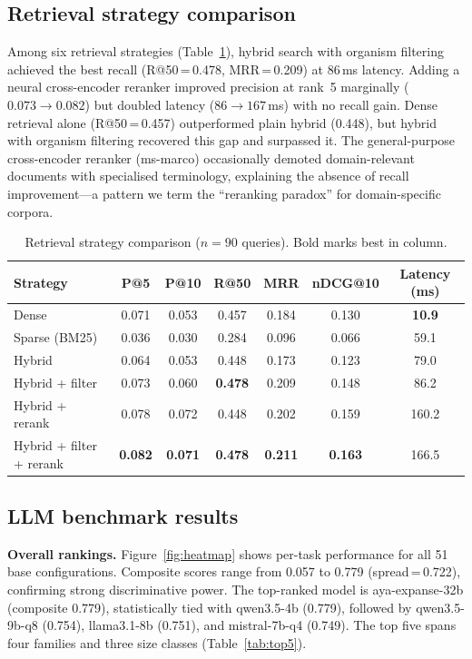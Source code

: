 \documentclass[sn-nature]{sn-jnl}
\begin{document}
\subsection{Retrieval strategy comparison}\label{sec:retrieval-results}

Among six retrieval strategies (Table~\ref{tab:retrieval}), hybrid search
with organism filtering achieved the best recall (R@50\,=\,0.478,
MRR\,=\,0.209) at 86\,ms latency. Adding a neural cross-encoder reranker
improved precision at rank~5 marginally ($0.073 \to 0.082$) but doubled
latency ($86 \to 167$\,ms) with no recall gain. Dense retrieval alone
(R@50\,=\,0.457) outperformed plain hybrid (0.448), but hybrid with organism
filtering recovered this gap and surpassed it. The general-purpose
cross-encoder reranker (ms-marco) occasionally demoted domain-relevant
documents with specialised terminology, explaining the absence of recall
improvement---a pattern we term the ``reranking paradox'' for domain-specific
corpora.

\begin{table}[t]
\caption{Retrieval strategy comparison ($n = 90$ queries). Bold marks best
  in column.}\label{tab:retrieval}
\begin{tabular}{lcccccc}
\toprule
Strategy & P@5 & P@10 & R@50 & MRR & nDCG@10 & Latency (ms) \\
\midrule
Dense               & 0.071 & 0.053 & 0.457 & 0.184 & 0.130 & \textbf{10.9} \\
Sparse (BM25)       & 0.036 & 0.030 & 0.284 & 0.096 & 0.066 & 59.1 \\
Hybrid              & 0.064 & 0.053 & 0.448 & 0.173 & 0.123 & 79.0 \\
Hybrid + filter     & 0.073 & 0.060 & \textbf{0.478} & 0.209 & 0.148 & 86.2 \\
Hybrid + rerank     & 0.078 & 0.072 & 0.448 & 0.202 & 0.159 & 160.2 \\
Hybrid + filter + rerank & \textbf{0.082} & \textbf{0.071} & \textbf{0.478} & \textbf{0.211} & \textbf{0.163} & 166.5 \\
\bottomrule
\end{tabular}
\end{table}

\subsection{LLM benchmark results}\label{sec:llm-results}

\textbf{Overall rankings.} Figure~\ref{fig:heatmap} shows per-task
performance for all 51 base configurations. Composite scores range from
0.057 to 0.779 (spread\,=\,0.722), confirming strong discriminative power.
The top-ranked model is aya-expanse-32b (composite 0.779), statistically
tied with qwen3.5-4b (0.779), followed by qwen3.5-9b-q8 (0.754),
llama3.1-8b (0.751), and mistral-7b-q4 (0.749). The top five spans four
families and three size classes (Table~\ref{tab:top5}).
\end{document}
